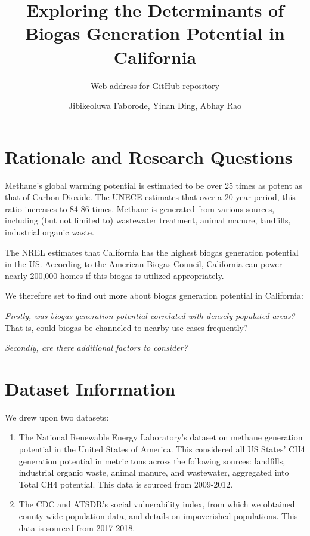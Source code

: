 \documentclass[
  12pt,
]{article}
\title{Exploring the Determinants of Biogas Generation Potential in
California}
\subtitle{Web address for GitHub repository}
\author{Jibikeoluwa Faborode, Yinan Ding, Abhay Rao}
\date{}
\begin{document}
\maketitle

\newpage
\tableofcontents 
\newpage
\listoftables 
\newpage
\listoffigures 
\newpage

\hypertarget{rationale-and-research-questions}{%
\section{Rationale and Research
Questions}\label{rationale-and-research-questions}}

Methane's global warming potential is estimated to be over 25 times as
potent as that of Carbon Dioxide. The
\href{https://unece.org/challenge\#:~:text=Methane\%20is\%20a\%20powerful\%20greenhouses,grows\%20to\%2084\%2D86\%20times.}{UNECE}
estimates that over a 20 year period, this ratio increases to 84-86
times. Methane is generated from various sources, including (but not
limited to) wastewater treatment, animal manure, landfills, industrial
organic waste.

The NREL estimates that California has the highest biogas generation
potential in the US. According to the
\href{chrome-extension://efaidnbmnnnibpcajpcglclefindmkaj/viewer.html?pdfurl=https\%3A\%2F\%2Famericanbiogascouncil.org\%2Fwp-content\%2Fuploads\%2F2019\%2F05\%2FABCBiogasStateProfile_CA.pdf\&clen=226298\&chunk=true}{American
Biogas Council}, California can power nearly 200,000 homes if this
biogas is utilized appropriately.

We therefore set to find out more about biogas generation potential in
California:

\emph{Firstly, was biogas generation potential correlated with densely
populated areas?} That is, could biogas be channeled to nearby use cases
frequently?

\emph{Secondly, are there additional factors to consider?}

\newpage

\hypertarget{dataset-information}{%
\section{Dataset Information}\label{dataset-information}}

We drew upon two datasets:

\begin{enumerate}
\def\labelenumi{\arabic{enumi}.}
\item
  The National Renewable Energy Laboratory's dataset on methane
  generation potential in the United States of America. This considered
  all US States' CH4 generation potential in metric tons across the
  following sources: landfills, industrial organic waste, animal manure,
  and wastewater, aggregated into Total CH4 potential. This data is
  sourced from 2009-2012.
\item
  The CDC and ATSDR's social vulnerability index, from which we obtained
  county-wide population data, and details on impoverished populations.
  This data is sourced from 2017-2018.
\end{enumerate}
\end{document}
